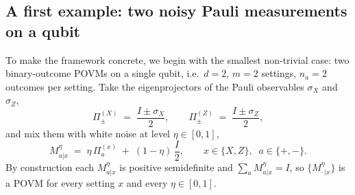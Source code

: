 \documentclass[oneside, a4paper, onecolumn, 11pt]{article}
\theoremstyle{definition}
\theoremstyle{plain}
\theoremstyle{remark}
\begin{document}
\subsection{A first example: two noisy Pauli measurements on a qubit}
\label{sec:sdp-2qubit}

To make the framework concrete, we begin with the smallest non-trivial
case: two binary-outcome POVMs on a single qubit, i.e.\ $d = 2$, $m = 2$
settings, $n_a = 2$ outcomes per setting. Take the eigenprojectors of
the Pauli observables $\sigma_X$ and $\sigma_Z$,
\begin{equation}
  \Pi^{(X)}_{\pm} \;=\; \frac{I \pm \sigma_X}{2},
  \qquad
  \Pi^{(Z)}_{\pm} \;=\; \frac{I \pm \sigma_Z}{2},
\end{equation}
and mix them with white noise at level $\eta \in [0,1]$,
\begin{equation}
  M^{\eta}_{a|x} \;=\; \eta\, \Pi^{(x)}_{a}
                  \;+\; (1-\eta)\, \frac{I}{2},
  \qquad x \in \{X, Z\},\;\; a \in \{+,-\}.
  \label{eq:noisy-pauli-2}
\end{equation}
By construction each $M^{\eta}_{a|x}$ is positive semidefinite and
$\sum_a M^{\eta}_{a|x} = I$, so $\{M^{\eta}_{\cdot\,|x}\}$ is a POVM for
every setting $x$ and every $\eta \in [0,1]$.
\end{document}

